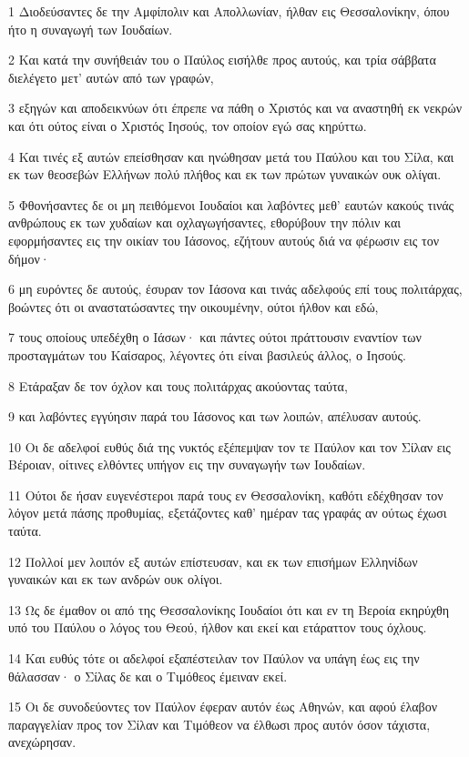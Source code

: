 \par 1 Διοδεύσαντες δε την Αμφίπολιν και Απολλωνίαν, ήλθαν εις Θεσσαλονίκην, όπου ήτο η συναγωγή των Ιουδαίων.
\par 2 Και κατά την συνήθειάν του ο Παύλος εισήλθε προς αυτούς, και τρία σάββατα διελέγετο μετ' αυτών από των γραφών,
\par 3 εξηγών και αποδεικνύων ότι έπρεπε να πάθη ο Χριστός και να αναστηθή εκ νεκρών και ότι ούτος είναι ο Χριστός Ιησούς, τον οποίον εγώ σας κηρύττω.
\par 4 Και τινές εξ αυτών επείσθησαν και ηνώθησαν μετά του Παύλου και του Σίλα, και εκ των θεοσεβών Ελλήνων πολύ πλήθος και εκ των πρώτων γυναικών ουκ ολίγαι.
\par 5 Φθονήσαντες δε οι μη πειθόμενοι Ιουδαίοι και λαβόντες μεθ' εαυτών κακούς τινάς ανθρώπους εκ των χυδαίων και οχλαγωγήσαντες, εθορύβουν την πόλιν και εφορμήσαντες εις την οικίαν του Ιάσονος, εζήτουν αυτούς διά να φέρωσιν εις τον δήμον·
\par 6 μη ευρόντες δε αυτούς, έσυραν τον Ιάσονα και τινάς αδελφούς επί τους πολιτάρχας, βοώντες ότι οι αναστατώσαντες την οικουμένην, ούτοι ήλθον και εδώ,
\par 7 τους οποίους υπεδέχθη ο Ιάσων· και πάντες ούτοι πράττουσιν εναντίον των προσταγμάτων του Καίσαρος, λέγοντες ότι είναι βασιλεύς άλλος, ο Ιησούς.
\par 8 Ετάραξαν δε τον όχλον και τους πολιτάρχας ακούοντας ταύτα,
\par 9 και λαβόντες εγγύησιν παρά του Ιάσονος και των λοιπών, απέλυσαν αυτούς.
\par 10 Οι δε αδελφοί ευθύς διά της νυκτός εξέπεμψαν τον τε Παύλον και τον Σίλαν εις Βέροιαν, οίτινες ελθόντες υπήγον εις την συναγωγήν των Ιουδαίων.
\par 11 Ούτοι δε ήσαν ευγενέστεροι παρά τους εν Θεσσαλονίκη, καθότι εδέχθησαν τον λόγον μετά πάσης προθυμίας, εξετάζοντες καθ' ημέραν τας γραφάς αν ούτως έχωσι ταύτα.
\par 12 Πολλοί μεν λοιπόν εξ αυτών επίστευσαν, και εκ των επισήμων Ελληνίδων γυναικών και εκ των ανδρών ουκ ολίγοι.
\par 13 Ως δε έμαθον οι από της Θεσσαλονίκης Ιουδαίοι ότι και εν τη Βεροία εκηρύχθη υπό του Παύλου ο λόγος του Θεού, ήλθον και εκεί και ετάραττον τους όχλους.
\par 14 Και ευθύς τότε οι αδελφοί εξαπέστειλαν τον Παύλον να υπάγη έως εις την θάλασσαν· ο Σίλας δε και ο Τιμόθεος έμειναν εκεί.
\par 15 Οι δε συνοδεύοντες τον Παύλον έφεραν αυτόν έως Αθηνών, και αφού έλαβον παραγγελίαν προς τον Σίλαν και Τιμόθεον να έλθωσι προς αυτόν όσον τάχιστα, ανεχώρησαν.

